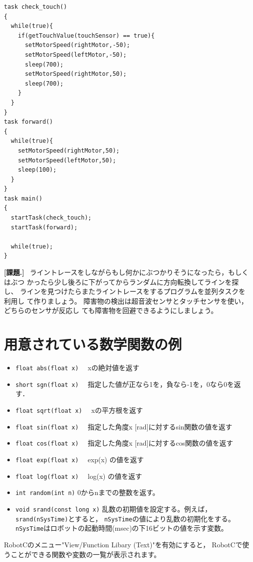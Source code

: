 \documentclass[11pt]{jsarticle}
\makeatletter
\newcounter{wnum}[section]
\def\thewnum{課題\thesection.\the\c@wnum}
\def\work{\refstepcounter{wnum}%
  \vspace{3mm}\noindent\textbf{[\thewnum]}~}
\def\nmindex{\@ifnextchar[{\@nmindex}{\@@nmindex}}
\def\@nmindex[#1]#2{#2\index{#1@#2}}
\def\@@nmindex#1{#1\index{#1}}
\makeatother
\begin{document}
\begin{lstlisting}
task check_touch()
{
  while(true){
    if(getTouchValue(touchSensor) == true){
      setMotorSpeed(rightMotor,-50);
      setMotorSpeed(leftMotor,-50);
      sleep(700);
      setMotorSpeed(rightMotor,50);
      sleep(700);
    }
  }
}
task forward()
{
  while(true){
    setMotorSpeed(rightMotor,50);
    setMotorSpeed(leftMotor,50);
    sleep(100);
  }
}
task main()
{
  startTask(check_touch);
  startTask(forward);

  while(true);
} 
\end{lstlisting}


\work
ライントレースをしながらもし何かにぶつかりそうになったら，もしくはぶつ
かったら少し後ろに下がってからランダムに方向転換してラインを探し、
ラインを見つけたらまたライントレースをするプログラムを並列タスクを利用し
て作りましょう。
障害物の検出は超音波センサとタッチセンサを使い，どちらのセンサが反応し
ても障害物を回避できるようにしましょう。

\newpage
\appendix
\section{用意されている数学関数の例\label{sec:math}}

\begin{itemize}
\item 
{}
\verb|float abs(float x)|
　xの絶対値を返す

\item 
{}
\verb|short sgn(float x)|
　指定した値が正なら1を，負なら-1を，0なら0を返す．

\item 
{}
\verb|float sqrt(float x)|
　xの平方根を返す

\item 
{}
\verb|float sin(float x)|
　指定した角度x [rad]に対するsin関数の値を返す

\item 
{}
\verb|float cos(float x)|
　指定した角度x [rad]に対するcos関数の値を返す

\item 
{}
\verb|float exp(float x)|
　exp(x) の値を返す

\item 
{}
\verb|float log(float x)|
　log(x) の値を返す

\item 
{}
\verb|int random(int n)|
0からnまでの整数\nmindex[らんすう]{乱数}を返す。

\item 
{}
\verb|void srand(const long x)|
乱数の初期値を設定する。例えば，\verb|srand(nSysTime)|とすると，
\verb|nSysTime|の値により乱数の初期化をする。
\verb|nSysTime|はロボットの起動時間(msec)の下16ビットの値を示す変数。

\end{itemize}


RobotCのメニュー"View/Function Libary (Text)"を有効にすると，
RobotCで使うことができる関数や変数の一覧が表示されます。


\printindex
\end{document}
